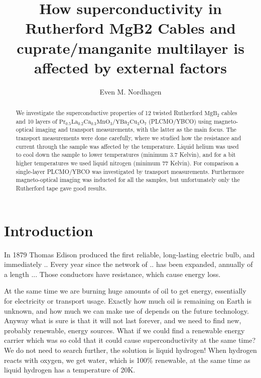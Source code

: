 \documentclass{comjnl}
\newcommand*\chem[1]{\ensuremath{\mathrm{#1}}}
\begin{document}
\title[Granular superconductivity of Rutherford cable and cuprate/manganite multilayer]{How superconductivity in Rutherford MgB2 Cables and cuprate/manganite multilayer is affected by external factors}
\author{Even M. Nordhagen}
 

 




\begin{abstract}
We investigate the superconductive properties of 12 twisted Rutherford \chem{MgB_2} cables and 10 layers of \chem{Pr_{0.5}La_{0.2}Ca_{0.3}MnO_3/YBa_2Cu_3O_7} (PLCMO/YBCO) using magneto-optical imaging and transport measurements, with the latter as the main focus. The transport measurements were done carefully, where we studied how the resistance and current through the sample was affected by the temperature. Liquid helium was used to cool down the sample to lower temperatures (minimum 3.7 Kelvin), and for a bit higher temperatures we used liquid nitrogen (minimum 77 Kelvin). For comparison a single-layer PLCMO/YBCO was investigated by transport measurements. Furthermore magneto-optical imaging was inducted for all the samples, but unfortunately only the Rutherford tape gave good results.
\end{abstract}

\maketitle


\section{Introduction}
In 1879 Thomas Edison produced the first reliable, long-lasting electric bulb, and immediately .. Every year since the network of .. has been expanded, annually of a length ... Those conductors have resistance, which cause energy loss. 

At the same time we are burning huge amounts of oil to get energy, essentially for electricity or transport usage. Exactly how much oil is remaining on Earth is unknown, and how much we can make use of depends on the future technology. Anyway what is sure is that it will not last forever, and we need to find new, probably renewable, energy sources. What if we could find a renewable energy carrier which was so cold that it could cause superconductivity at the same time? We do not need to search further, the solution is liquid hydrogen! When hydrogen reacts with oxygen, we get water, which is 100\% renewable, at the same time as liquid hydrogen has a temperature of 20K. 
\end{document}
